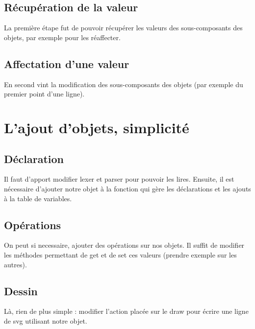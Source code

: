 \documentclass[11pt]{report} %
\begin{document}
\subsection{Récupération de la valeur}
La première étape fut de pouvoir récupérer les valeurs des sous-composants des objets, par exemple pour les réaffecter.
\subsection{Affectation d'une valeur}
En second vint la modification des sous-composants des objets (par exemple du premier point d'une ligne).

\section{L'ajout d'objets, simplicité}
\subsection{Déclaration}
Il faut d'apport modifier lexer et parser pour pouvoir les lires. Ensuite, il est nécessaire d'ajouter notre objet à la fonction qui gère les déclarations et les ajouts à la table de variables.
\subsection{Opérations}
On peut si necessaire, ajouter des opérations sur nos objets. Il suffit de modifier les méthodes permettant de get et de set ces valeurs (prendre exemple sur les autres).
\subsection{Dessin}
Là, rien de plus simple : modifier l'action placée sur le draw pour écrire une ligne de svg utilisant notre objet.
\end{document}

